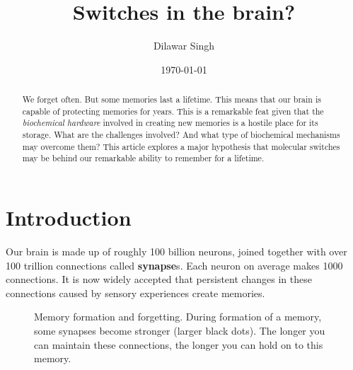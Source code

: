 \documentclass[]{resonance}
\title{Switches in the brain?}
\author{Dilawar Singh}
\date{\today}
\begin{document}
\maketitle


\begin{abstract}
    We forget often. But some memories last a lifetime.
    This means that our brain is capable of protecting memories for years.
    This is a remarkable feat given that the \emph{biochemical hardware}
    involved in creating new memories is a hostile place for
    its storage.  What are the challenges involved? And what type of 
    biochemical mechanisms may overcome them? This article explores a major
    hypothesis that molecular switches may be behind our remarkable ability to
    remember for a lifetime.
\end{abstract}

\maketitle
{}

\section{Introduction}\label{sec:intro}

Our brain is made up of roughly 100 billion neurons, joined together with over
100 trillion connections called \textbf{synapse}s. Each neuron on average makes
1000 connections. It is now widely accepted that persistent changes in these
connections caused by sensory experiences create memories.

\begin{figure}[hb] 
    \centering
    \caption{Memory formation and forgetting. During formation of
        a memory, some synapses become stronger (larger black dots). 
        The longer you can maintain these connections, the longer you 
        can hold on to this memory.
    }\label{fig:engram}
\end{figure}
\end{document}
